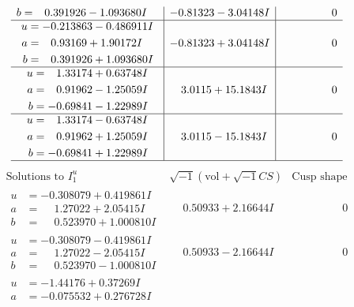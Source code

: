 \documentclass[1p]{elsarticle_modified}
\theoremstyle{definition}
\newcommand{\I}{\sqrt{-1}}
\begin{document}
$$\begin{array}{c|c|c}
\begin{aligned}
b &= \phantom{-}0.391926 - 1.093680 I\end{aligned}
 & -0.81323 - 3.04148 I & \phantom{-0.000000 } 0 \\ \hline\begin{aligned}
u &= -0.213863 - 0.486911 I \\
a &= \phantom{-}0.93169 + 1.90172 I \\
b &= \phantom{-}0.391926 + 1.093680 I\end{aligned}
 & -0.81323 + 3.04148 I & \phantom{-0.000000 } 0 \\ \hline\begin{aligned}
u &= \phantom{-}1.33174 + 0.63748 I \\
a &= \phantom{-}0.91962 - 1.25059 I \\
b &= -0.69841 - 1.22989 I\end{aligned}
 & \phantom{-}3.0115 + 15.1843 I & \phantom{-0.000000 } 0 \\ \hline\begin{aligned}
u &= \phantom{-}1.33174 - 0.63748 I \\
a &= \phantom{-}0.91962 + 1.25059 I \\
b &= -0.69841 + 1.22989 I\end{aligned}
 & \phantom{-}3.0115 - 15.1843 I & \phantom{-0.000000 } 0\\
 \hline 
 \end{array}$$\newpage$$\begin{array}{c|c|c}  
\text{Solutions to }I^u_{1}& \I (\text{vol} + \sqrt{-1}CS) & \text{Cusp shape}\\
 \hline 
\begin{aligned}
u &= -0.308079 + 0.419861 I \\
a &= \phantom{-}1.27022 + 2.05415 I \\
b &= \phantom{-}0.523970 + 1.000810 I\end{aligned}
 & \phantom{-}0.50933 + 2.16644 I & \phantom{-0.000000 } 0 \\ \hline\begin{aligned}
u &= -0.308079 - 0.419861 I \\
a &= \phantom{-}1.27022 - 2.05415 I \\
b &= \phantom{-}0.523970 - 1.000810 I\end{aligned}
 & \phantom{-}0.50933 - 2.16644 I & \phantom{-0.000000 } 0 \\ \hline\begin{aligned}
u &= -1.44176 + 0.37269 I \\
a &= -0.075532 + 0.276728 I \\

\end{aligned}
\end{array}$$
\end{document}
